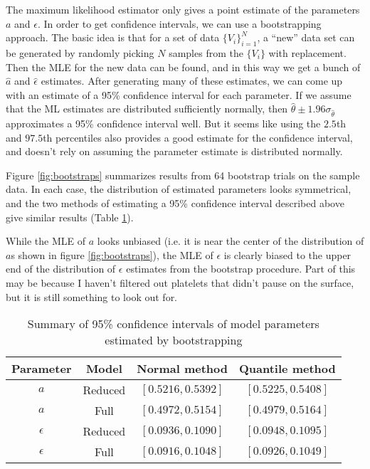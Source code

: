 \documentclass{article}
\begin{document}
The maximum likelihood estimator only gives a point estimate of the
parameters $a$ and $\epsilon$. In order to get confidence intervals,
we can use a bootstrapping approach. The basic idea is that for a set
of data $\{V_i\}_{i=1}^N$, a ``new'' data set can be generated by
randomly picking $N$ samples from the $\{V_i\}$ with replacement. Then
the MLE for the new data can be found, and in this way we get a bunch
of $\hat{a}$ and $\hat{\epsilon}$ estimates. After generating many of
these estimates, we can come up with an estimate of a 95\% confidence
interval for each parameter. If we assume that the ML estimates are
distributed sufficiently normally, then
$\hat{\theta} \pm 1.96 \sigma_{\hat{\theta}}$ approximates a 95\%
confidence interval well. But it seems like using the $2.5$th and
$97.5$th percentiles also provides a good estimate for the confidence
interval, and doesn't rely on assuming the parameter estimate is
distributed normally.

Figure \ref{fig:bootstraps} summarizes results from 64 bootstrap
trials on the sample data. In each case, the distribution of estimated
parameters looks symmetrical, and the two methods of estimating a 95\%
confidence interval described above give similar results (Table
\ref{tab:conf-int}).

While the MLE of $a$ looks unbiased (i.e. it is near the center of the
distribution of $a$s shown in figure \ref{fig:bootstraps}), the MLE of
$\epsilon$ is clearly biased to the upper end of the distribution of
$\epsilon$ estimates from the bootstrap procedure. Part of this may be
because I haven't filtered out platelets that didn't pause on the
surface, but it is still something to look out for. 

\begin{table}
  \centering
  \begin{tabular}{cccc}
    \hline
    Parameter & Model & Normal method & Quantile method \\
    \hline
    $a$ & Reduced & $[0.5216, 0.5392]$ & $[0.5225, 0.5408]$ \\
    $a$ & Full & $[0.4972, 0.5154]$ & $[0.4979, 0.5164]$ \\
    $\epsilon$ & Reduced & $[0.0936, 0.1090]$ & $[0.0948, 0.1095]$ \\
    $\epsilon$ & Full & $[0.0916, 0.1048]$ & $[0.0926, 0.1049]$\\
    \hline
  \end{tabular}
  \caption[Summary of confidence intervals]{Summary of 95\% confidence
    intervals of model parameters estimated by bootstrapping}
  \label{tab:conf-int}
\end{table}
\end{document}
